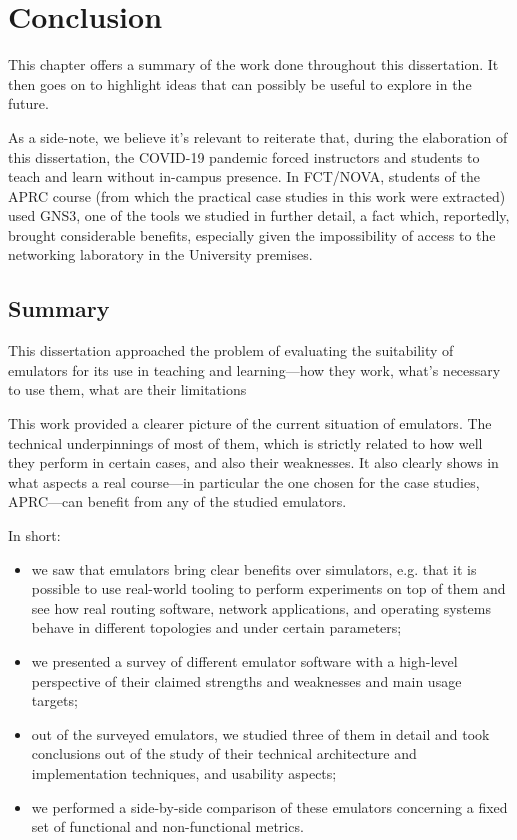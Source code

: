 
\chapter{Conclusion}
\label{ch:conclusion}

This chapter offers a summary of the work done throughout this dissertation.
It then goes on to highlight ideas that can possibly be useful to explore in the future.

As a side-note, we believe it's relevant to reiterate that, during the elaboration of this dissertation, the COVID-19 pandemic forced instructors and students to teach and learn without in-campus presence.
In FCT/NOVA, students of the APRC course (from which the practical case studies in this work were extracted) used GNS3, one of the tools we studied in further detail, a fact which, reportedly, brought considerable benefits, especially given the impossibility of access to the networking laboratory in the University premises.

\section{Summary}

This dissertation approached the problem of evaluating the suitability of emulators for its use in teaching and learning---how they work, what's necessary to use them, what are their limitations\textellipsis

This work provided a clearer picture of the current situation of emulators.
The technical underpinnings of most of them, which is strictly related to how well they perform in certain cases, and also their weaknesses.
It also clearly shows in what aspects a real course---in particular the one chosen for the case studies, APRC---can benefit from any of the studied emulators.

In short:
\begin{itemize}
  \item we saw that emulators bring clear benefits over simulators, e.g. that it is possible to use real-world tooling to perform experiments on top of them and see how real routing software, network applications, and operating systems behave in different topologies and under certain parameters;
  \item we presented a survey of different emulator software with a high-level perspective of their claimed strengths and weaknesses and main usage targets;
  \item out of the surveyed emulators, we studied three of them in detail and took conclusions out of the study of their technical architecture and implementation techniques, and usability aspects;
  \item we performed a side-by-side comparison of these emulators concerning a fixed set of functional and non-functional metrics.
\end{itemize}

